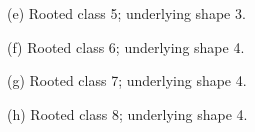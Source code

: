 \documentclass[10pt,a4paper]{article}
\begin{document}
\noindent\hfill
\begin{minipage}[t]{.47\textwidth}\centering
\resizebox{8.2cm}{!}{}\par\smallskip
{\small (e) Rooted class 5; underlying shape 3.}\par
\end{minipage}\hfill
\begin{minipage}[t]{.47\textwidth}\centering
\resizebox{8.2cm}{!}{}\par\smallskip
{\small (f) Rooted class 6; underlying shape 4.}\par
\end{minipage}\hfill
\par\vspace{3mm}
\noindent\hfill
\begin{minipage}[t]{.47\textwidth}\centering
\resizebox{8.2cm}{!}{}\par\smallskip
{\small (g) Rooted class 7; underlying shape 4.}\par
\end{minipage}\hfill
\begin{minipage}[t]{.47\textwidth}\centering
\resizebox{8.2cm}{!}{}\par\smallskip
{\small (h) Rooted class 8; underlying shape 4.}\par
\end{minipage}\hfill
\par\vspace{3mm}
\end{document}
